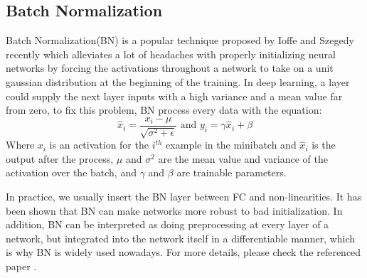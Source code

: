 \subsection{Batch Normalization}
Batch Normalization(BN) is a popular technique proposed by Ioffe and Szegedy \cite{ioffe2015batch} recently 
which alleviates a lot of headaches with properly initializing neural networks by forcing 
the activations throughout a network 
to take on a unit gaussian distribution at the beginning of the training. 
In deep learning, a layer could supply the next layer inputs with a high variance and a mean value far from zero,
to fix this problem, BN process every data with the equation:
$$\hat{x}_{i}=\frac{x_{i}-\mu}{\sqrt{\sigma^{2}+\epsilon}} \text { and } y_{i}=\gamma \hat{x}_{i}+\beta$$
Where $x_{i}$ is an activation for the $i^{th}$ example in the minibatch and $\hat{x}_{i}$ is the output after 
the process, $\mu$ and $\sigma^{2}$ are the mean value and variance of the activation over the batch, and
$\gamma$ and $\beta$ are trainable parameters.

In practice, we usually insert the BN layer between FC and non-linearities.
It has been shown that BN can make networks more robust to bad 
initialization. In addition, BN can be interpreted as doing preprocessing at every layer of a network, but 
integrated into the network itself in a differentiable manner, which is why BN is widely used nowadays.
For more details, please check the referenced paper \cite{ioffe2015batch}.

